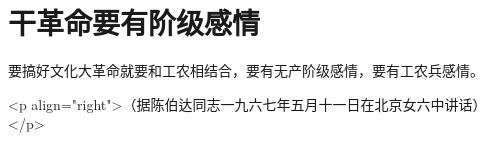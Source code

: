 \section[干革命要有阶级感情（一九六七年五月）]{干革命要有阶级感情}


要搞好文化大革命就要和工农相结合，要有无产阶级感情，要有工农兵感情。

<p align="right">（据陈伯达同志一九六七年五月十一日在北京女六中讲话）</p>



